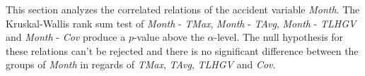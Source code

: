 This section analyzes the correlated relations of the accident variable \textit{Month}. The Kruskal-Wallis rank sum test of \textit{Month} - \textit{TMax}, \textit{Month} - \textit{TAvg}, \textit{Month} - \textit{TLHGV} and \textit{Month} - \textit{Cov} produce a $p$-value above the $\alpha$-level. The null hypothesis for these relations can't be rejected and there is no significant difference between the groups of \textit{Month} in regards of \textit{TMax}, \textit{TAvg}, \textit{TLHGV} and \textit{Cov}.

